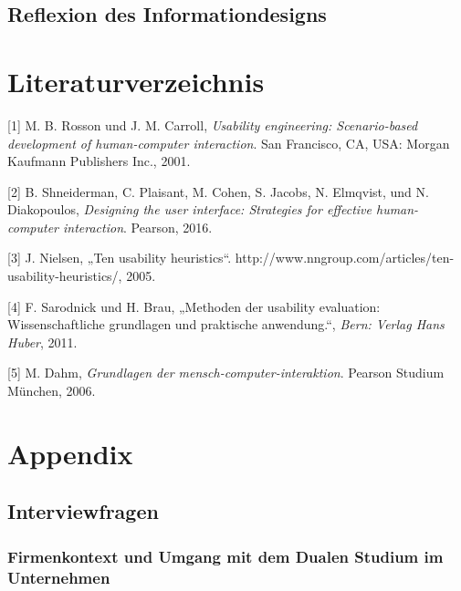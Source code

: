 \documentclass[
  12pt,
  ngerman,
  a4paper,
]{article}
\begin{document}
\hypertarget{reflexion-des-informationdesigns}{%
\subsection{Reflexion des
Informationdesigns}\label{reflexion-des-informationdesigns}}

\pagebreak
{}
\setcounter{page}{4}

\section*{Literaturverzeichnis}

\hypertarget{refs}{}
\leavevmode\hypertarget{ref-sbd}{}%
{[}1{]} M. B. Rosson und J. M. Carroll, \emph{Usability engineering:
Scenario-based development of human-computer interaction}. San
Francisco, CA, USA: Morgan Kaufmann Publishers Inc., 2001.

\leavevmode\hypertarget{ref-heur:shneiderman}{}%
{[}2{]} B. Shneiderman, C. Plaisant, M. Cohen, S. Jacobs, N. Elmqvist,
und N. Diakopoulos, \emph{Designing the user interface: Strategies for
effective human-computer interaction}. Pearson, 2016.

\leavevmode\hypertarget{ref-heur:nielsen}{}%
{[}3{]} J. Nielsen, „Ten usability heuristics``.
http://www.nngroup.com/articles/ten-usability-heuristics/, 2005.

\leavevmode\hypertarget{ref-heur:brauux2fsarodnick}{}%
{[}4{]} F. Sarodnick und H. Brau, „Methoden der usability evaluation:
Wissenschaftliche grundlagen und praktische anwendung.``, \emph{Bern:
Verlag Hans Huber}, 2011.

\leavevmode\hypertarget{ref-heur:dahm}{}%
{[}5{]} M. Dahm, \emph{Grundlagen der mensch-computer-interaktion}.
Pearson Studium München, 2006.

\pagebreak
\appendix
\section*{Appendix}
\renewcommand{\thesubsection}{\Alph{subsection}}

\hypertarget{interviewfragen}{%
\subsection{Interviewfragen}\label{interviewfragen}}

\hypertarget{firmenkontext-und-umgang-mit-dem-dualen-studium-im-unternehmen}{%
\subsubsection{Firmenkontext und Umgang mit dem Dualen Studium im
Unternehmen}\label{firmenkontext-und-umgang-mit-dem-dualen-studium-im-unternehmen}}
\end{document}
